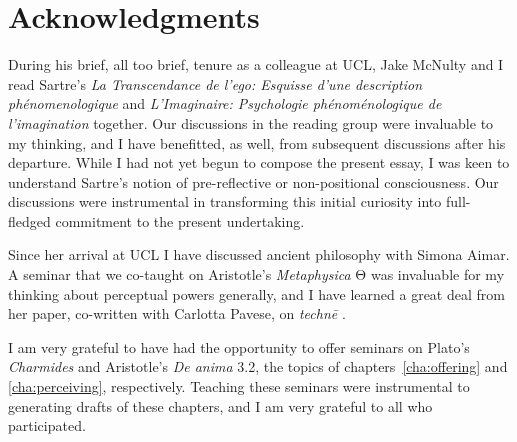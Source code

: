 \chapter{Acknowledgments} %
\label{cha:acknowledgments}

During his brief, all too brief, tenure as a colleague at UCL, Jake McNulty and I read Sartre's \emph{La Transcendance de l'ego: Esquisse d'une description phénomenologique} and \emph{L'Imaginaire: Psychologie ph{\'e}nom{\'e}nologique de l'imagination} together. Our discussions in the reading group were invaluable to my thinking, and I have benefitted, as well, from subsequent discussions after his departure. While I had not yet begun to compose the present essay, I was keen to understand Sartre's notion of pre-reflective or non-positional consciousness. Our discussions were instrumental in transforming this initial curiosity into full-fledged commitment to the present undertaking. 

Since her arrival at UCL I have discussed ancient philosophy with Simona Aimar. A seminar that we co-taught on Aristotle's \emph{Metaphysica} {\sbl Θ} was invaluable for my thinking about perceptual powers generally, and I have learned a great deal from her paper, co-written with Carlotta Pavese, on \emph{technē} \citep{Aimar:2025tg}.

I am very grateful to have had the opportunity to offer seminars on Plato's \emph{Charmides} and Aristotle's \emph{De anima} 3.2, the topics of chapters~\ref{cha:offering} and \ref{cha:perceiving}, respectively. Teaching these seminars were instrumental to generating drafts of these chapters, and I am very grateful to all who participated.

